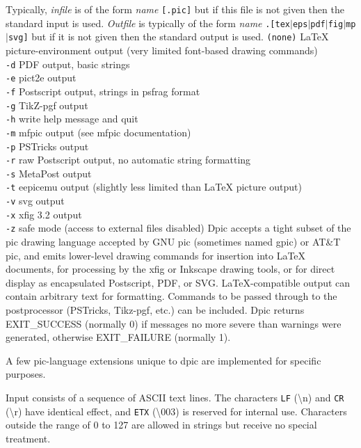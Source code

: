 Typically,
{\it infile}
is of the form
{\it name}
{\tt [.pic]}
but if this file is not given then the standard input is used.
{\it Outfile}
is typically of the form
{\it name}
{\tt .[tex$|$eps$|$pdf$|$fig$|$mp$|$svg]}
but if it is not given then the standard output is used.
{\tt (none)}
LaTeX picture-environment output (very limited font-based drawing commands)
\\\hbox{}\hskip-1pt
{\tt -d}
PDF output, basic strings
\\\hbox{}\hskip-1pt
{\tt -e}
pict2e output
\\\hbox{}\hskip-1pt
{\tt -f}
Postscript output, strings in psfrag format
\\\hbox{}\hskip-1pt
{\tt -g}
TikZ-pgf output
\\\hbox{}\hskip-1pt
{\tt -h}
write help message and quit
\\\hbox{}\hskip-1pt
{\tt -m}
mfpic output (see mfpic documentation)
\\\hbox{}\hskip-1pt
{\tt -p}
PSTricks output
\\\hbox{}\hskip-1pt
{\tt -r}
raw Postscript output, no automatic string formatting
\\\hbox{}\hskip-1pt
{\tt -s}
MetaPost output
\\\hbox{}\hskip-1pt
{\tt -t}
eepicemu output (slightly less limited than LaTeX picture output)
\\\hbox{}\hskip-1pt
{\tt -v}
svg output
\\\hbox{}\hskip-1pt
{\tt -x}
xfig 3.2 output
\\\hbox{}\hskip-1pt
{\tt -z}
safe mode (access to external files disabled)
%
Dpic accepts a tight subset of the pic drawing language accepted by
GNU pic (sometimes named gpic) or AT\&T pic, and emits lower-level
drawing commands for insertion into LaTeX documents, for processing by
the xfig or Inkscape drawing tools, or for direct display as encapsulated
Postscript, PDF, or SVG. LaTeX-compatible output can contain arbitrary
text for formatting.  Commands to be passed through to the postprocessor
(PSTricks, Tikz-pgf, etc.)  can be included.  Dpic returns EXIT\_SUCCESS
(normally 0) if messages no more severe than warnings were generated,
otherwise EXIT\_FAILURE (normally 1).

A few pic-language extensions unique to dpic
are implemented for specific purposes.

Input consists of a sequence of ASCII text lines.
The characters
{\tt LF}
(\textbackslash n) and
{\tt CR}
(\textbackslash r) have identical effect,
and
{\tt ETX}
(\textbackslash 003) is reserved for internal use.
Characters outside the range of 0 to 127 are allowed in strings but
receive no special treatment.

